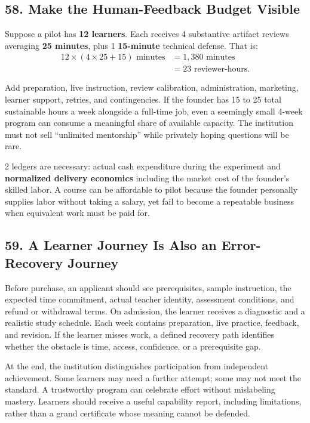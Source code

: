 \subsection*{58. Make the Human-Feedback Budget Visible}

Suppose a pilot has \textbf{12 learners}. Each receives 4 substantive artifact reviews averaging \textbf{25 minutes}, plus 1 \textbf{15-minute} technical defense. That is:
\begin{equation}
\begin{aligned}
12 \times (4 \times 25 + 15)\text{ minutes} &= 1{,}380\text{ minutes} \\
&= 23\text{ reviewer-hours}.
\end{aligned}
\end{equation}

Add preparation, live instruction, review calibration, administration, marketing, learner support, retries, and contingencies. If the founder has 15 to 25 total sustainable hours a week alongside a full-time job, even a seemingly small 4-week program can consume a meaningful share of available capacity. The institution must not sell ``unlimited mentorship'' while privately hoping questions will be rare.

2 ledgers are necessary: actual cash expenditure during the experiment and \textbf{normalized delivery economics} including the market cost of the founder's skilled labor. A course can be affordable to pilot because the founder personally supplies labor without taking a salary, yet fail to become a repeatable business when equivalent work must be paid for.

\subsection*{59. A Learner Journey Is Also an Error-Recovery Journey}

Before purchase, an applicant should see prerequisites, sample instruction, the expected time commitment, actual teacher identity, assessment conditions, and refund or withdrawal terms. On admission, the learner receives a diagnostic and a realistic study schedule. Each week contains preparation, live practice, feedback, and revision. If the learner misses work, a defined recovery path identifies whether the obstacle is time, access, confidence, or a prerequisite gap.

At the end, the institution distinguishes participation from independent achievement. Some learners may need a further attempt; some may not meet the standard. A trustworthy program can celebrate effort without mislabeling mastery. Learners should receive a useful capability report, including limitations, rather than a grand certificate whose meaning cannot be defended.

